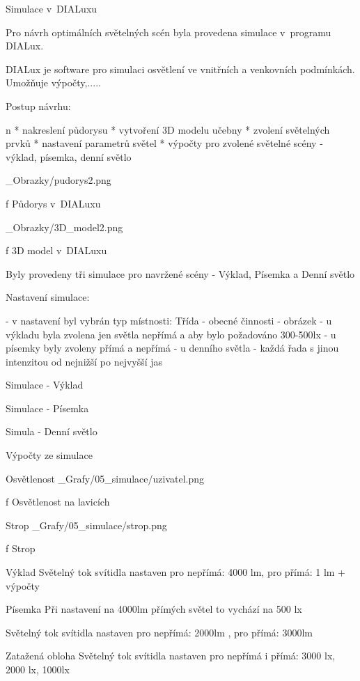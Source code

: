 \chap Simulace v~DIALuxu

Pro návrh optimálních světelných scén byla provedena simulace v~programu DIALux.

DIALux je software pro simulaci osvětlení ve vnitřních a venkovních podmínkách. Umožňuje výpočty,.....

\medskip
Postup návrhu:

\begitems \style n
* nakreslení půdorysu
* vytvoření 3D modelu učebny
* zvolení světelných prvků
* nastavení parametrů světel
* výpočty pro zvolené světelné scény - výklad, písemka, denní světlo
\enditems
\medskip

\medskip {}
\picw=8cm _Obrazky/pudorys2.png
\caption/f Půdorys v~DIALuxu
\medskip

\medskip {}
\picw=8cm _Obrazky/3D_model2.png
\caption/f 3D model v~DIALuxu
\medskip

Byly provedeny tři simulace pro navržené scény - Výklad, Písemka a Denní světlo

Nastavení simulace:

- v nastavení byl vybrán typ místnosti: Třída - obecné činnosti
- obrázek
- u výkladu byla zvolena jen světla nepřímá a aby bylo požadováno 300-500lx
- u písemky byly zvoleny přímá a nepřímá 
- u denního světla - každá řada s jinou intenzitou od nejnižší po nejvyšší jas

\sec Simulace - Výklad

\sec Simulace - Písemka

\sec Simula - Denní světlo


Výpočty ze simulace

Osvětlenost
\medskip {}
\picw=15cm _Grafy/05_simulace/uzivatel.png
\caption/f Osvětlenost na lavicích
\medskip


Strop
\medskip {}
\picw=15cm _Grafy/05_simulace/strop.png
\caption/f Strop
\medskip



Výklad 
Světelný tok svítidla nastaven pro nepřímá: 4000 lm, pro přímá: 1 lm
+ výpočty

Písemka
Při nastavení na 4000lm přímých světel to vychází na 500 lx

Světelný tok svítidla nastaven pro nepřímá: 2000lm , pro přímá: 3000lm

Zatažená obloha
Světelný tok svítidla nastaven pro nepřímá i přímá: 3000 lx, 2000 lx, 1000lx